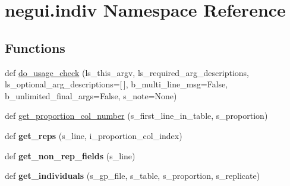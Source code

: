 \hypertarget{namespacenegui_1_1indiv}{}\section{negui.\+indiv Namespace Reference}
\label{namespacenegui_1_1indiv}
\subsection*{Functions}
\begin{DoxyCompactItemize}
\item 
def \hyperlink{namespacenegui_1_1indiv_a8d366fcefa810f96a2cc323b84d6ea75}{do\+\_\+usage\+\_\+check} (ls\+\_\+this\+\_\+argv, ls\+\_\+required\+\_\+arg\+\_\+descriptions, ls\+\_\+optional\+\_\+arg\+\_\+descriptions=\mbox{[}$\,$\mbox{]}, b\+\_\+multi\+\_\+line\+\_\+msg=False, b\+\_\+unlimited\+\_\+final\+\_\+args=False, s\+\_\+note=None)
\item 
def \hyperlink{namespacenegui_1_1indiv_ae7fb810142ce304fc6d7c59e8062d1a5}{get\+\_\+proportion\+\_\+col\+\_\+number} (s\+\_\+first\+\_\+line\+\_\+in\+\_\+table, s\+\_\+proportion)
\item 
def {\bfseries get\+\_\+reps} (s\+\_\+line, i\+\_\+proportion\+\_\+col\+\_\+index)\hypertarget{namespacenegui_1_1indiv_a9dbf39b9108b81e93dce10027eec64b1}{}\label{namespacenegui_1_1indiv_a9dbf39b9108b81e93dce10027eec64b1}

\item 
def {\bfseries get\+\_\+non\+\_\+rep\+\_\+fields} (s\+\_\+line)\hypertarget{namespacenegui_1_1indiv_a97fd0239760bfb61c81ab35d9a426522}{}\label{namespacenegui_1_1indiv_a97fd0239760bfb61c81ab35d9a426522}

\item 
def {\bfseries get\+\_\+individuals} (s\+\_\+gp\+\_\+file, s\+\_\+table, s\+\_\+proportion, s\+\_\+replicate)\hypertarget{namespacenegui_1_1indiv_a147a55c6726cfcfce42b3dd9e11764c6}{}\label{namespacenegui_1_1indiv_a147a55c6726cfcfce42b3dd9e11764c6}

\end{DoxyCompactItemize}
